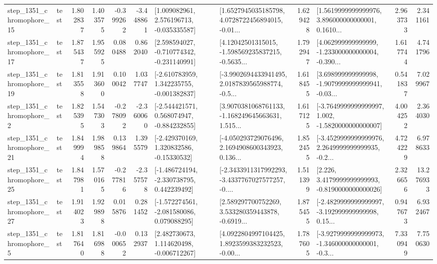 \begin{tabular}{llrrrrllrlrr}
 step\_1351\_chromophore\_15 &      test &      1.802837 &    1.403575 &     -0.399262 & -3.448861 &    [1.009082961, 2.576196713, -0.035335587] &  [1.6527945035185798, 4.0728722456894015, -0.01... &       1.629428 &  [1.5619999999999976, 3.896000000000001, 0.1610... &            2.963733 &          2.341161 \\
 step\_1351\_chromophore\_17 &      test &      1.875437 &    1.955925 &      0.080488 &  0.862040 &   [2.598594027, -0.710774342, -0.231140991] &  [4.12042501315015, -1.598569235837215, -0.5635... &       1.792947 &  [4.062999999999999, -1.233000000000004, -0.390... &            1.617744 &          4.741796 \\
 step\_1351\_chromophore\_19 &      test &      1.813558 &    1.913600 &      0.100042 &  1.037747 &   [-2.610783959, 1.342235755, -0.001382837] &  [-3.9902694433941495, 2.0187839565988774, -0.5... &       1.618455 &  [3.698999999999998, -1.9079999999999941, -0.03... &            0.541837 &          7.029967 \\
  step\_1351\_chromophore\_2 &      test &      1.825395 &    1.547303 &     -0.278092 & -2.360060 &   [-2.544421571, 0.568074947, -0.884232855] &  [3.9070381068761133, -1.168249645663631, 1.515... &       1.617125 &  [-3.7649999999999997, 1.002, -1.5820000000000007] &            4.004252 &          2.364030 \\
 step\_1351\_chromophore\_21 &      test &      1.849994 &    1.989858 &      0.139864 &  1.395579 &    [-2.429370169, 1.320832586, -0.15330532] &  [-4.050293729076496, 2.1694908600343923, 0.136... &       1.852455 &  [-3.4529999999999976, 2.2649999999999935, -0.2... &            4.724229 &          6.978633 \\
 step\_1351\_chromophore\_25 &      test &      1.847981 &    1.570165 &     -0.277816 & -2.357578 &   [-1.486724194, -2.330738795, 0.442239492] &  [-2.3433911317992293, -3.4337767027577257, -0.... &       1.511399 &   [2.226, 3.4179999999999993, -0.8190000000000026] &            2.326656 &         13.276933 \\
 step\_1351\_chromophore\_27 &      test &      1.914023 &    1.929898 &      0.015876 &  0.281452 &   [-1.572274561, -2.081580086, 0.079088295] &  [2.589297700752269, 3.533280359443878, -0.6919... &       1.875455 &  [-2.4829999999999997, -3.192999999999998, 0.15... &            0.947673 &          6.932467 \\
  step\_1351\_chromophore\_5 &      test &      1.817640 &    1.816988 &     -0.000652 &  0.132937 &    [2.482730673, 1.114620498, -0.006712267] &  [4.0922804997104425, 1.8923599383232523, -0.00... &       1.787605 &  [-3.9279999999999973, -1.346000000000001, -0.3... &            7.330949 &          7.750630 \\

\end{tabular}
